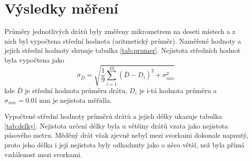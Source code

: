 \documentclass{../concepts/prepareprotokol} %
\begin{document}
\section{Výsledky měření}

Průměry jednotlivých drátů byly změřeny mikrometrem na deseti místech a z nich byl vypočtena střední hodnota (aritmetický průměr). Naměřené hodnoty a jejich střední hodnoty shrnuje tabulka \ref{tab:prumer}. Nejistota středních hodnot byla vypočtena jako 
\begin{equation}
    \sigma_{\bar{D}} = \sqrt{\frac{1}{9} \sum_{i=1}^{10} (\bar{D} - D_i)^2 + \sigma_{mic}^2} \,
\end{equation}
kde $\bar{D}$ je střední hodnota průměru drátu, $D_i$ je i-tá hodnota průměru a $\sigma_{mic}=\SI{0.01}{\milli\metre}$ je nejistota měřidla.

Vypočtené střední hodnoty průměrů drátů a jejich délky ukazuje tabulka \ref{tab:delky}. Nejistota určení délky byla u většiny drátů vzata jako nejistota pásového metru. Měděný drát však zjevně nebyl mezi svorkami dokonale napnutý, proto jeho délka i její nejistota byly odhadnuty jako o něco větší, než byla přímá vzdálenost mezi svorkami.
\end{document}

